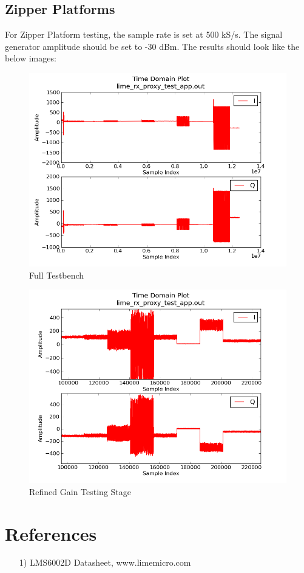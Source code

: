 \documentclass{article}
\begin{document}
\newpage
\subsection*{Zipper Platforms}
For Zipper Platform testing, the sample rate is set at 500 kS/s. The signal generator amplitude should be set to -30 dBm. The results should look like the below images:

\begin{figure}[H]
	\centerline{\includegraphics[scale=0.5]{zedboard_output_large}}
	\caption{Full Testbench}
\end{figure}

\begin{figure}[H]
	\centerline{\includegraphics[scale=0.5]{zedboard_output_small}}
	\caption{Refined Gain Testing Stage}
\end{figure}

\section*{References}
\begin{flushleft}
	\begin{itemize}
		\item[1)] LMS6002D Datasheet, www.limemicro.com
	\end{itemize}
\end{flushleft}
\end{document}
